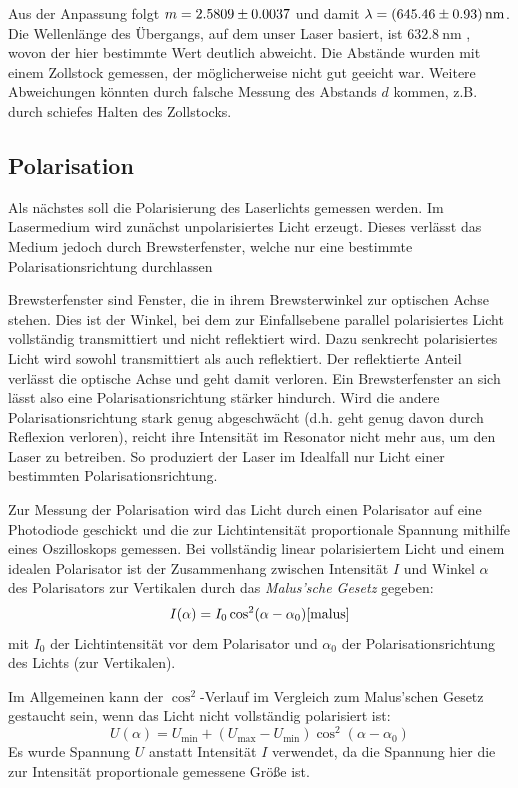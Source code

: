 \documentclass{article}
\newcommand{\defc}{black}
\newcommand{\colorT}[2][blue]{\color{#1}{#2}\color{\defc}}
\newcommand{\todo}[1]{\colorT[red]{\textbf{(#1)}}}
\newcommand{\mr}{\mathrm}
\begin{document}
Aus der Anpassung folgt $m = \num{2.5809\pm0.0037}$ und damit $\lambda = \SI{645.46 \pm 0.93}{\nm}$.
Die Wellenlänge des Übergangs, auf dem unser Laser basiert, ist $\SI{632.8}{\nm}$ \cite{Anleitung},
wovon der hier bestimmte Wert deutlich abweicht.
Die Abstände wurden mit einem Zollstock gemessen, der möglicherweise nicht gut geeicht war. Weitere Abweichungen
könnten durch falsche Messung des Abstands $d$ kommen, z.B. durch schiefes Halten des Zollstocks.


\subsection{Polarisation}
Als nächstes soll die Polarisierung des Laserlichts gemessen werden. Im Lasermedium wird zunächst unpolarisiertes Licht
erzeugt. Dieses verlässt das Medium jedoch durch Brewsterfenster, welche nur eine bestimmte Polarisationsrichtung durchlassen

Brewsterfenster sind Fenster, die in ihrem Brewsterwinkel zur optischen Achse stehen. Dies ist der Winkel, bei dem
zur Einfallsebene parallel polarisiertes Licht vollständig transmittiert und nicht reflektiert wird.
Dazu senkrecht polarisiertes Licht wird sowohl transmittiert als auch reflektiert. Der reflektierte Anteil
verlässt die optische Achse und geht damit verloren.
Ein Brewsterfenster an sich lässt also eine Polarisationsrichtung stärker hindurch. Wird die andere Polarisationsrichtung
stark genug abgeschwächt (d.h. geht genug davon durch Reflexion verloren), reicht ihre Intensität
im Resonator nicht mehr aus, um den Laser zu betreiben.
So produziert der Laser im Idealfall nur Licht einer bestimmten Polarisationsrichtung.



Zur Messung der Polarisation wird das Licht durch einen Polarisator auf eine Photodiode geschickt
und die zur Lichtintensität proportionale Spannung mithilfe eines Oszilloskops gemessen.
Bei vollständig linear polarisiertem Licht und einem idealen Polarisator
ist der Zusammenhang zwischen Intensität $I$ und Winkel $\alpha$ des
Polarisators zur Vertikalen durch das \textit{Malus'sche Gesetz} gegeben:
\begin{equation}
  I(\alpha) = I_0 \cos^2(\alpha - \alpha_0) \cite{malus}
\end{equation}
mit $I_0$ der Lichtintensität vor dem Polarisator und $\alpha_0$ der Polarisationsrichtung des Lichts (zur Vertikalen).

Im Allgemeinen kann der $\cos^2$-Verlauf im Vergleich zum Malus'schen Gesetz gestaucht sein, wenn das Licht nicht vollständig
polarisiert ist:
\begin{equation}
  U(\alpha) = U_\mr{min} + (U_\mr{max}-U_\mr{min}) \cos^2(\alpha - \alpha_0) \label{eq:malus-real}
\end{equation}
Es wurde Spannung $U$ anstatt Intensität $I$ verwendet, da die Spannung hier die
zur Intensität proportionale gemessene Größe ist.
\end{document}
